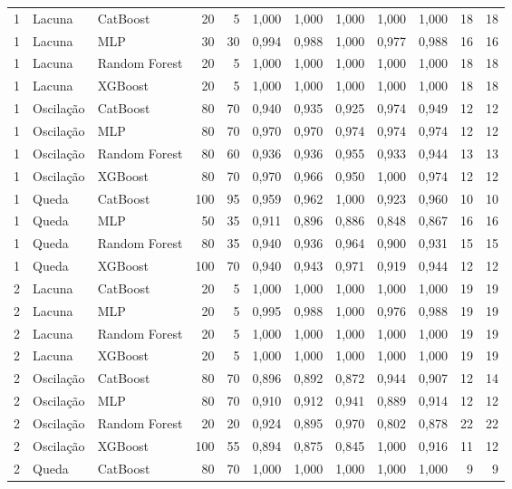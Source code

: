 \begin{longtable}{@{}rllrrrrrrrrr@{}}
1 & Lacuna & CatBoost & 20 & 5 & 1,000 & 1,000 & 1,000 & 1,000 & 1,000 & 18 & 18 \\
1 & Lacuna & MLP & 30 & 30 & 0,994 & 0,988 & 1,000 & 0,977 & 0,988 & 16 & 16 \\
1 & Lacuna & Random Forest & 20 & 5 & 1,000 & 1,000 & 1,000 & 1,000 & 1,000 & 18 & 18 \\
1 & Lacuna & XGBoost & 20 & 5 & 1,000 & 1,000 & 1,000 & 1,000 & 1,000 & 18 & 18 \\
1 & Oscilação & CatBoost & 80 & 70 & 0,940 & 0,935 & 0,925 & 0,974 & 0,949 & 12 & 12 \\
1 & Oscilação & MLP & 80 & 70 & 0,970 & 0,970 & 0,974 & 0,974 & 0,974 & 12 & 12 \\
1 & Oscilação & Random Forest & 80 & 60 & 0,936 & 0,936 & 0,955 & 0,933 & 0,944 & 13 & 13 \\
1 & Oscilação & XGBoost & 80 & 70 & 0,970 & 0,966 & 0,950 & 1,000 & 0,974 & 12 & 12 \\
1 & Queda & CatBoost & 100 & 95 & 0,959 & 0,962 & 1,000 & 0,923 & 0,960 & 10 & 10 \\
1 & Queda & MLP & 50 & 35 & 0,911 & 0,896 & 0,886 & 0,848 & 0,867 & 16 & 16 \\
1 & Queda & Random Forest & 80 & 35 & 0,940 & 0,936 & 0,964 & 0,900 & 0,931 & 15 & 15 \\
1 & Queda & XGBoost & 100 & 70 & 0,940 & 0,943 & 0,971 & 0,919 & 0,944 & 12 & 12 \\
2 & Lacuna & CatBoost & 20 & 5 & 1,000 & 1,000 & 1,000 & 1,000 & 1,000 & 19 & 19 \\
2 & Lacuna & MLP & 20 & 5 & 0,995 & 0,988 & 1,000 & 0,976 & 0,988 & 19 & 19 \\
2 & Lacuna & Random Forest & 20 & 5 & 1,000 & 1,000 & 1,000 & 1,000 & 1,000 & 19 & 19 \\
2 & Lacuna & XGBoost & 20 & 5 & 1,000 & 1,000 & 1,000 & 1,000 & 1,000 & 19 & 19 \\
2 & Oscilação & CatBoost & 80 & 70 & 0,896 & 0,892 & 0,872 & 0,944 & 0,907 & 12 & 14 \\
2 & Oscilação & MLP & 80 & 70 & 0,910 & 0,912 & 0,941 & 0,889 & 0,914 & 12 & 12 \\
2 & Oscilação & Random Forest & 20 & 20 & 0,924 & 0,895 & 0,970 & 0,802 & 0,878 & 22 & 22 \\
2 & Oscilação & XGBoost & 100 & 55 & 0,894 & 0,875 & 0,845 & 1,000 & 0,916 & 11 & 12 \\
2 & Queda & CatBoost & 80 & 70 & 1,000 & 1,000 & 1,000 & 1,000 & 1,000 & 9 & 9 \\

\end{longtable}
